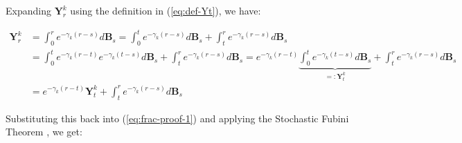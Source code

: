 \documentclass{article}
\begin{document}
Expanding $\boldsymbol{Y}_r^k$ using the definition in (\ref{eq:def-Yt}), we have:
\begin{small}
\begin{align}
    \boldsymbol{Y}_r^k&=\int_0^re^{-\gamma_k(r-s)}d\boldsymbol{B}_s=\int_0^te^{-\gamma_k(r-s)}d\boldsymbol{B}_s+\int_t^re^{-\gamma_k(r-s)}d\boldsymbol{B}_s\nonumber\\
    &=\int_0^te^{-\gamma_k(r-t)}e^{-\gamma_k(t-s)}d\boldsymbol{B}_s+\int_t^re^{-\gamma_k(r-s)}d\boldsymbol{B}_s=e^{-\gamma_k(r-t)}\underbrace{\int_0^te^{-\gamma_k(t-s)}d\boldsymbol{B}_s}_{=:\boldsymbol{Y}_t^k}+\int_t^re^{-\gamma_k(r-s)}d\boldsymbol{B}_s\nonumber\\
    &=e^{-\gamma_k(r-t)}\boldsymbol{Y}_t^k+\int_t^re^{-\gamma_k(r-s)}d\boldsymbol{B}_s
\end{align}
\end{small}
Substituting this back into (\ref{eq:frac-proof-1}) and applying the Stochastic Fubini Theorem \citep{harms2019affine}, we get:
\end{document}
